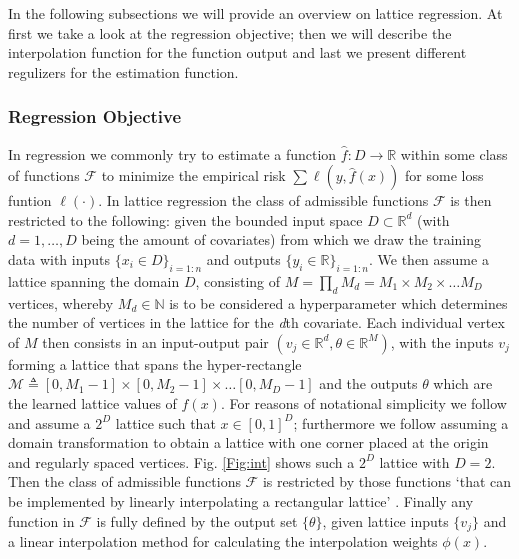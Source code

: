  In the following subsections we will provide an overview on lattice regression. At first we take a look at the regression objective; then we will describe the interpolation function for the function output and last we present different regulizers for the estimation function.

\subsubsection{Regression Objective}

In regression we commonly try to estimate a function $\hat{f}:D \rightarrow \mathbb{R}$ within some class of functions $\mathcal{F}$ to minimize the empirical risk $\sum \ell(y, \hat{f}(x))$ for some loss funtion $\ell(\cdot)$. In lattice regression the class of admissible functions $\mathcal{F}$ is then restricted to the following: given the bounded input space $D \subset \mathbb{R}^d$ (with $d = 1, \dots, D$ being the amount of covariates) from which we draw the training data with inputs $\{x_i \in D\}_{i=1:n}$ and outputs $\{y_i \in \mathbb{R}\}_{i=1:n}$. We then assume a lattice spanning the domain $D$, consisting of $M = \prod_{d} M_d = M_1 \times M_2 \times \dots M_D$ vertices, whereby $M_d \in \mathbb{N}$ is to be considered a hyperparameter which determines the number of vertices in the lattice for the \textit{d}th covariate. Each individual vertex of $M$ then consists in an input-output pair $(v_j \in \mathbb{R}^d, \theta \in \mathbb{R}^M)$, with the inputs $v_j$ forming a lattice that spans the hyper-rectangle $\mathcal{M} \triangleq [0, M_1 - 1] \times [0, M_2 -1] \times \dots [0, M_D -1]$ and the outputs $\theta$ which are the learned lattice values of $f(x)$. For reasons of notational simplicity we follow \citep{gupta2016monotonic} and assume a $2^D$ lattice such that $x \in [0,1]^D$; furthermore we follow \citep{garcia2012optimized} assuming a domain transformation to obtain a lattice with one corner placed at the origin and regularly spaced vertices. Fig. \ref{Fig:int} shows such a $2^D$ lattice with $D=2$. Then the class of admissible functions $\mathcal{F}$ is restricted by those functions `that can be implemented by linearly interpolating a rectangular lattice' \citep[Sec.~2]{garcia2012optimized}.  Finally any function in $\mathcal{F}$ is fully defined by the output set $\{\theta\}$, given lattice inputs $\{v_j\}$ and a linear interpolation method for calculating the interpolation weights $\phi(x)$. 

